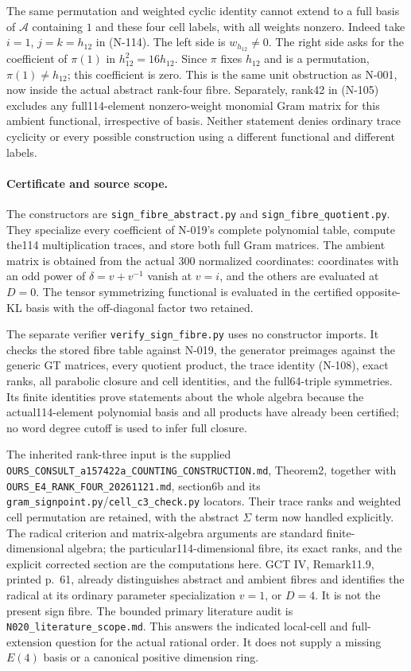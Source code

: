 The same permutation and weighted cyclic identity cannot
extend to a full basis of $\mathcal A$ containing $1$ and
these four cell labels, with all weights nonzero.
Indeed take $i=1$, $j=k=h_{12}$ in (N-114).
The left side is $w_{h_{12}}\ne0$.  The right side asks for
the coefficient of $\pi(1)$ in $h_{12}^2=16h_{12}$.
Since $\pi$ fixes $h_{12}$ and is a permutation,
$\pi(1)\ne h_{12}$; this coefficient is zero.
This is the same unit obstruction as N-001, now inside the
actual abstract rank-four fibre.  Separately, rank42 in
(N-105) excludes any full114-element nonzero-weight monomial
Gram matrix for this ambient functional, irrespective of
basis.  Neither statement denies ordinary trace cyclicity
or every possible construction using a different functional
and different labels.

\paragraph{Certificate and source scope.}
The constructors are \nolinkurl{sign_fibre_abstract.py} and
\nolinkurl{sign_fibre_quotient.py}.  They specialize every
coefficient of N-019's complete polynomial table, compute
the114 multiplication traces, and store both full Gram
matrices.  The ambient matrix is obtained from the actual
300 normalized coordinates: coordinates with an odd power
of $\delta=v+v^{-1}$ vanish at $v=i$, and the others are
evaluated at $D=0$.  The tensor symmetrizing functional is
evaluated in the certified opposite-KL basis with the
off-diagonal factor two retained.

The separate verifier \nolinkurl{verify_sign_fibre.py}
uses no constructor imports.  It checks the stored fibre
table against N-019, the generator preimages against the
generic GT matrices, every quotient product, the trace
identity (N-108), exact ranks, all parabolic closure and
cell identities, and the full64-triple symmetries.
Its finite identities prove statements about the whole
algebra because the actual114-element polynomial basis
and all products have already been certified; no word
degree cutoff is used to infer full closure.

The inherited rank-three input is the supplied
\nolinkurl{OURS_CONSULT_a157422a_COUNTING_CONSTRUCTION.md},
Theorem2, together with
\nolinkurl{OURS_E4_RANK_FOUR_20261121.md}, section6b and its
\nolinkurl{gram_signpoint.py}/\nolinkurl{cell_c3_check.py}
locators.  Their trace ranks and weighted cell permutation
are retained, with the abstract $\Sigma$ term now handled
explicitly.  The radical criterion and matrix-algebra
arguments are standard finite-dimensional algebra; the
particular114-dimensional fibre, its exact ranks, and
the explicit corrected section are the computations here.
GCT IV, Remark11.9, printed p.~61, already distinguishes
abstract and ambient fibres and identifies the radical at
its ordinary parameter specialization $v=1$, or $D=4$.
It is not the present sign fibre.  The bounded primary
literature audit is \nolinkurl{N020_literature_scope.md}.
This answers the indicated local-cell and full-extension
question for the actual rational order.  It does not supply
a missing $E(4)$ basis or a canonical positive dimension ring.
